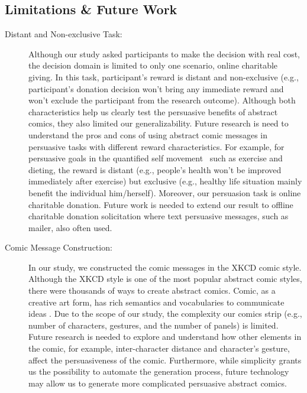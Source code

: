\subsection{Limitations \& Future Work}
\begin{description}

 \item[Distant and Non-exclusive Task:]  Although our study asked participants to make the decision with real cost, the decision domain is limited to only one scenario, online charitable giving. In this task, participant's reward is distant and non-exclusive (e.g., participant's donation decision won't bring any immediate reward and won't exclude the participant from the research outcome). Although both characteristics help us clearly test the persuasive benefits of abstract comics, they also limited our generalizability. Future research is need to understand the pros and cons of using abstract comic messages in persuasive tasks with different reward characteristics. For example, for persuasive goals in the quantified self movement~\cite{Epstein2014,Choe2014} such as exercise and dieting, the reward is distant (e.g., people's health won't be improved immediately after exercise) but exclusive (e.g., healthy life situation mainly benefit the individual him/herself). Moreover, our persuasion task is online charitable donation. Future work is needed to extend our result to offline charitable donation solicitation where text persuasive messages, such as mailer, also often used. 
  
 \item[Comic Message Construction:] In our study, we constructed the comic messages in the XKCD comic style. Although the XKCD style is one of the most popular abstract comic styles, there were thousands of ways to create abstract comics.  Comic, as a creative art form, has rich semantics and vocabularies to communicate ideas \cite{scott1993understanding}. Due to the scope of our study, the complexity our comics strip (e.g., number of characters, gestures, and the number of panels) is limited. Future research is needed to explore and understand how other elements in the comic, for example, inter-character distance and character's gesture, affect the persuasiveness of the comic. Furthermore, while simplicity grants us the possibility to automate the generation process, future technology may allow us to generate more complicated persuasive abstract comics.
  
\end{description}

